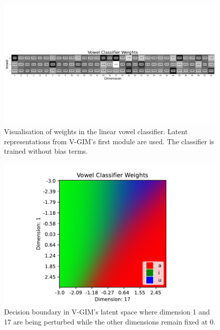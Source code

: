 	\begin{figure}
		\centering
		\includegraphics[width=1\linewidth, trim={0 10cm 0 10cm}, clip]{graphs/vowel_classifier_weights}
		\caption{
			Visualisation of weights in the linear vowel classifier. Latent representations from V-GIM's first module are used. The classifier is trained without bias terms.
		}
		\label{fig:vowelclassifierweights}
	\end{figure}
	
	
	\begin{figure}
		\centering
		\includegraphics[width=0.7\linewidth, clip]{graphs/vowel_classifier_weights_heatmap}
		\caption{Decision boundary in V-GIM's latent space where dimension 1 and 17 are being perturbed while the other dimensions remain fixed at 0.}
		\label{fig:vowelclassifierweightsheatmap}
	\end{figure}
	
	
	
	
		
		
		

